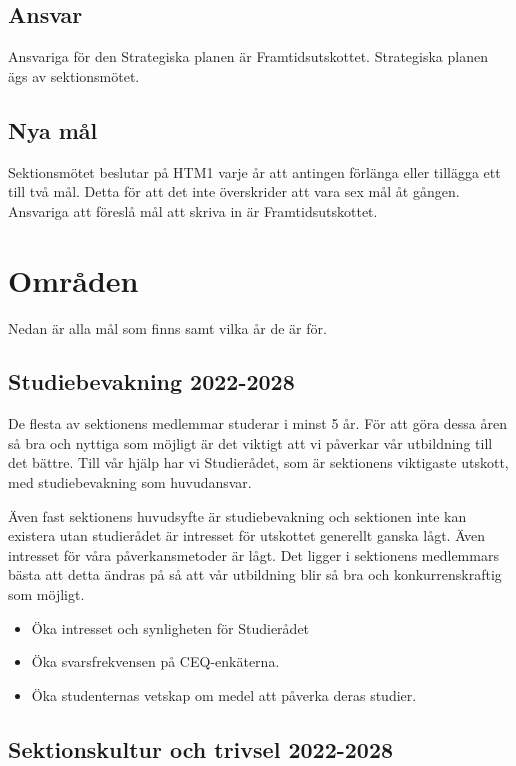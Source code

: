 \documentclass[nopdfbookmarks,a4paper, 11pt, twoside]{article}
\begin{document}
\subsection{Ansvar}
Ansvariga för den Strategiska planen är Framtidsutskottet. Strategiska planen ägs av sektionsmötet.

\subsection{Nya mål}
Sektionsmötet beslutar på HTM1 varje år att antingen förlänga eller tillägga ett till två mål. Detta för att det inte överskrider att vara sex mål åt gången. Ansvariga att föreslå mål att skriva in är Framtidsutskottet.

\newpage

\section{Områden}
Nedan är alla mål som finns samt vilka år de är för.

\subsection{Studiebevakning 2022-2028}

De flesta av sektionens medlemmar studerar i minst 5 år. För att göra dessa åren så bra och nyttiga som möjligt är det viktigt att vi påverkar vår utbildning till det bättre. Till vår hjälp har vi Studierådet, som är sektionens viktigaste utskott, med studiebevakning som huvudansvar.

Även fast sektionens huvudsyfte är studiebevakning och sektionen inte kan existera utan studierådet är intresset för utskottet generellt ganska lågt. Även intresset för våra påverkansmetoder är lågt. Det ligger i sektionens medlemmars bästa att detta ändras på så att vår utbildning blir så bra och konkurrenskraftig som möjligt.

\begin{itemize}
    \item Öka intresset och synligheten för Studierådet
    \item Öka svarsfrekvensen på CEQ-enkäterna.
    \item Öka studenternas vetskap om medel att påverka deras studier.
\end{itemize}

\subsection{Sektionskultur och trivsel 2022-2028}
\end{document}
